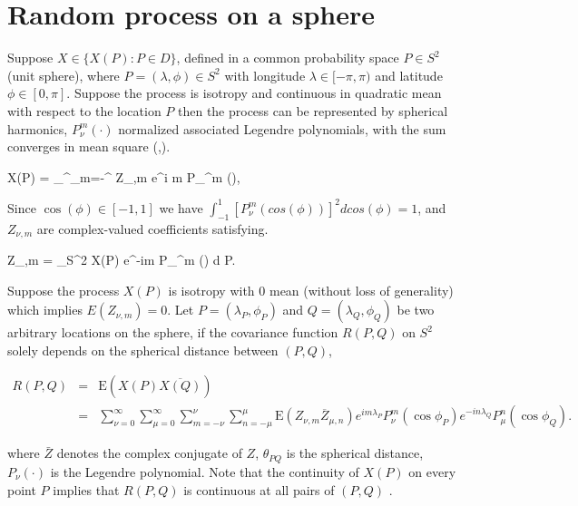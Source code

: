
\section{Random process on a sphere}
	
Suppose $X \in \{X(P): P\in D\}$, defined in a common probability space $P \in S^2$ (unit sphere), where $P=(\lambda, \phi) \in S^2$ with longitude $\lambda \in [-\pi, \pi)$ and latitude $\phi \in [0, \pi]$. Suppose the process is isotropy and continuous in quadratic mean with respect to the location $P$ then the process can be represented by spherical harmonics, $P_{\nu}^m(\cdot)$ normalized associated Legendre polynomials, with the sum converges in mean square (\cite{Jones1963},\cite{LiNorth1997, Huang2012}).   
			
	\beq \nonumber
	X(P) = \sum_{}^\infty \sum_{m=-\nu}^{\nu} Z_{\nu,m} e^{i m \lambda} P_{\nu}^m (\cos \phi),
	\eeq
			
	Since $\cos(\phi)\in[-1,1]$ we have $\int_{-1}^{1}[P_{\nu}^m(cos(\phi))]^2dcos(\phi) = 1$, and $Z_{\nu,m}$ are complex-valued coefficients satisfying.
			
	\beq \nonumber
	Z_{\nu,m} = \int_{S^2} X(P) e^{-im \lambda} P_{\nu}^m (\cos \phi) d P.
	\eeq
				
	Suppose the process $X(P)$ is isotropy with 0 mean (without loss of generality) which implies $E(Z_{\nu,m}) = 0$. Let $P = (\lambda_P, \phi_P)$ and $Q=(\lambda_Q, \phi_Q)$ be two arbitrary locations on the sphere, if the covariance function $R(P,Q)$ on $S^2$ solely depends on the spherical distance between $(P,Q)$,
	
	\begin{eqnarray*} \label{rpq_1}
		R(P, Q) &=& \mbox{E}(X(P) \overline{X(Q)}) \\
		&=& \sum_{\nu=0}^\infty \sum_{\mu=0}^\infty \sum_{m=-\nu}^{\nu} \sum_{n=-\mu}^{\mu} \mbox{E}(Z_{\nu,m} \overline{Z}_{\mu,n}) e^{im \lambda_P} P_{\nu}^m(\cos \phi_P) e^{-i n \lambda_Q} P_{\mu}^n (\cos \phi_Q).
	\end{eqnarray*}
				
	where $\bar{Z}$ denotes the complex conjugate of $Z$, $\theta_{PQ}$ is the spherical distance, $P_{\nu}(\cdot)$ is the Legendre polynomial. Note that the continuity of $X(P)$ on every point $P$ implies that $R(P, Q)$ is continuous at all pairs of $(P, Q)$ \cite[page 83]{Leadbetter1967}.
	
